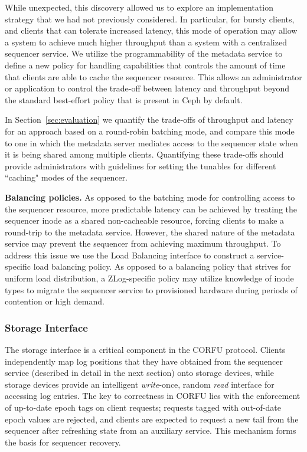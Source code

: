 While unexpected, this discovery allowed us to explore an implementation
strategy that we had not previously considered. In particular, for bursty
clients, and clients that can tolerate increased latency, this mode of
operation may allow a system to achieve much higher throughput than a system
with a centralized sequencer service.  We utilize the programmability of the
metadata service to define a new policy for handling capabilities that controls
the amount of time that clients are able to cache the sequencer resource. This
allows an administrator or application to control the trade-off between latency
and throughput beyond the standard best-effort policy that is present in Ceph
by default. 

In Section~\ref{sec:evaluation} we quantify the trade-offs of throughput and
latency for an approach based on a round-robin batching mode, and compare this
mode to one in which the metadata server mediates access to the sequencer state
when it is being shared among multiple clients. Quantifying these trade-offs
should provide administrators with guidelines for setting the tunables for
different ``caching" modes of the sequencer.

{\bf Balancing policies.} As opposed to the batching mode for controlling
access to the sequencer resource, more predictable latency can be achieved by
treating the sequencer inode as a shared non-cacheable resource, forcing
clients to make a round-trip to the metadata service. However, the shared
nature of the metadata service may prevent the sequencer from achieving maximum
throughput. To address this issue we use the Load Balancing interface to construct a
service-specific load balancing policy. As opposed to a balancing policy that
strives for uniform load distribution, a ZLog-specific policy may utilize
knowledge of inode types to migrate the sequencer service to provisioned
hardware during periods of contention or high demand.

\subsubsection{Storage Interface}

The storage interface is a critical component in the CORFU protocol. Clients
independently map log positions that they have obtained from the sequencer
service (described in detail in the next section) onto storage devices, while
storage devices provide an intelligent \emph{write}-once, random \emph{read}
interface for accessing log entries. The key to correctness in CORFU lies with
the enforcement of up-to-date epoch tags on client requests; requests tagged
with out-of-date epoch values are rejected, and clients are expected to request
a new tail from the sequencer after refreshing state from an auxiliary service.
This mechanism forms the basis for sequencer recovery.

